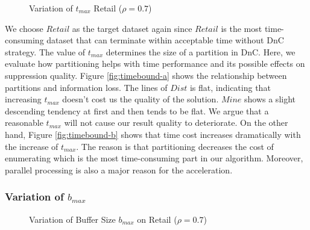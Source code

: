 \begin{figure}[th]
\centering
{}
\caption{Variation of $t_{max}$ Retail ($\rho = 0.7$)}\label{fig:timebound}
\end{figure}

We choose $Retail$ as the target dataset again since $Retail$
is the most time-consuming dataset that can terminate within
acceptable time without DnC strategy.
The value of $t_{max}$ determines the size of a partition in DnC.
Here, we evaluate how partitioning helps with time performance and
its possible effects on suppression quality.
Figure \ref{fig:timebound-a} shows the relationship between partitions
and information loss. The lines of  $Dist$ is flat, indicating that
increasing $t_{max}$ doesn't cost us the quality of the solution. $Mine$
shows a slight descending tendency at first and then tends to be flat.
We argue that a reasonable $t_{max}$ will not cause our result quality to
deteriorate.
On the other hand, Figure \ref{fig:timebound-b} shows that
time cost increases dramatically  with the increase of  $t_{max}$.
The reason is that partitioning decreases the cost of enumerating \qids which
is the most time-consuming part in our algorithm. Moreover, parallel
processing is also a major reason for the acceleration.

\subsubsection{Variation of $b_{max}$}

\begin{figure}[th]
\centering
{}
\caption{Variation of Buffer Size $b_{max}$ on Retail ($\rho=0.7$)}\label{fig:buffersize}
\end{figure}

